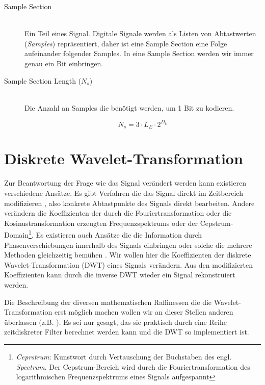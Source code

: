 \begin{description}
\item[Sample Section] \hfill \\
Ein Teil eines Signal. Digitale Signale werden als Listen von Abtastwerten (\textit{Samples}) repräsentiert, daher ist eine Sample Section eine Folge aufeinander folgender Samples. In eine Sample Section werden wir immer genau ein Bit einbringen.
	 
\item[Sample Section Length (${N}_{s}$)] \hfill \\
Die Anzahl an Samples die ben\"otigt werden, um 1 Bit zu kodieren. 

	 \begin{equation}
		 {N}_{s} = 3 \cdot {L}_{E} \cdot 2 ^ {{D}_{k}} \label{equ:samplseclength}
	 \end{equation}
	
\end{description}

\section{Diskrete Wavelet-Transformation}  
	
Zur Beantwortung der Frage wie das Signal ver\"andert werden kann existieren verschiedene Ans\"atze. Es gibt Verfahren die das Signal direkt im Zeitbereich modifizieren \cite{bassia2001robust}\cite{lie2006robust}, also konkrete Abtastpunkte des Signals direkt bearbeiten. Andere ver\"andern die Koeffizienten der durch die Fouriertransformation oder die Kosinustransformation erzeugten Frequenzspektrums \cite{chang2012location}\cite{??} oder der Cepstrum-Domain\footnote{\textit{Ceprstrum}: Kunstwort durch Vertauschung der Buchstaben des engl. \textit{Spectrum}. Der Cepstrum-Bereich wird durch die Fouriertransformation des logarithmischen Frequenzspektrums eines Signals aufgespannt}\cite{lee2000digital}\cite{li2000transparent}. Es existieren auch Ans\"atze die die Information durch Phasenverschiebungen innerhalb des Signals einbringen \cite{dong2004data}\cite{ansari2004data} oder solche die mehrere Methoden gleichzeitig bem\"uhen \cite{chang2012location}. Wir wollen hier die Koeffizienten der diskrete Wavelet-Transformation (DWT) eines Signals ver\"andern. Aus den modifizierten Koeffizienten kann durch die inverse DWT wieder ein Signal rekonstruiert werden. 
	
Die Beschreibung der diversen mathematischen Raffinessen die die Wavelet-Transformation erst m\"oglich machen wollen wir an dieser Stellen anderen \"uberlassen (z.B. \cite{??}). Es sei nur gesagt, das sie praktisch durch eine Reihe zeitdiskreter Filter berechnet werden kann und die DWT so implementiert ist. 

